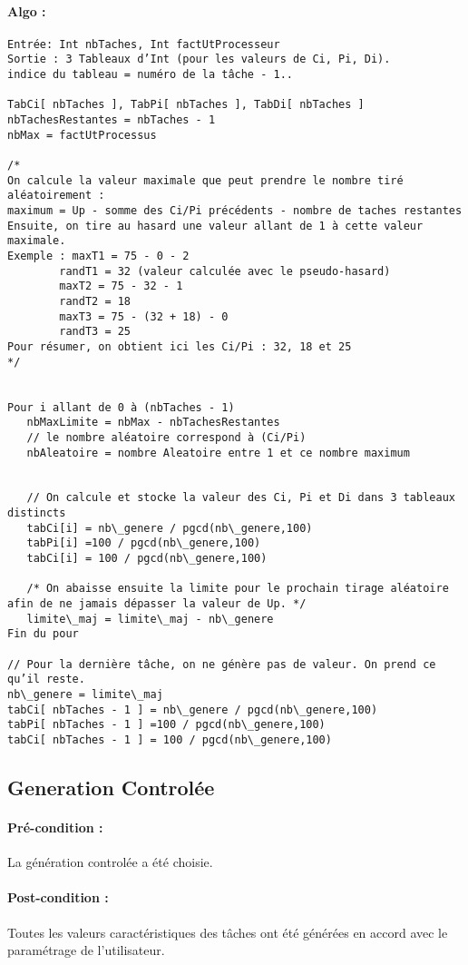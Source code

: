 		\paragraph{Algo :}
			\begin{verbatim}
Entrée: Int nbTaches, Int factUtProcesseur
Sortie : 3 Tableaux d’Int (pour les valeurs de Ci, Pi, Di). 
indice du tableau = numéro de la tâche - 1..

TabCi[ nbTaches ], TabPi[ nbTaches ], TabDi[ nbTaches ]
nbTachesRestantes = nbTaches - 1
nbMax = factUtProcessus 

/*
On calcule la valeur maximale que peut prendre le nombre tiré aléatoirement :
maximum = Up - somme des Ci/Pi précédents - nombre de taches restantes
Ensuite, on tire au hasard une valeur allant de 1 à cette valeur maximale.
Exemple : maxT1 = 75 - 0 - 2
	    randT1 = 32 (valeur calculée avec le pseudo-hasard)
	    maxT2 = 75 - 32 - 1
	    randT2 = 18
	    maxT3 = 75 - (32 + 18) - 0
	    randT3 = 25
Pour résumer, on obtient ici les Ci/Pi : 32, 18 et 25
*/


Pour i allant de 0 à (nbTaches - 1)
   nbMaxLimite = nbMax - nbTachesRestantes
   // le nombre aléatoire correspond à (Ci/Pi)
   nbAleatoire = nombre Aleatoire entre 1 et ce nombre maximum


   // On calcule et stocke la valeur des Ci, Pi et Di dans 3 tableaux distincts
   tabCi[i] = nb\_genere / pgcd(nb\_genere,100)
   tabPi[i] =100 / pgcd(nb\_genere,100)
   tabCi[i] = 100 / pgcd(nb\_genere,100)
	        
   /* On abaisse ensuite la limite pour le prochain tirage aléatoire afin de ne jamais dépasser la valeur de Up. */
   limite\_maj = limite\_maj - nb\_genere
Fin du pour

// Pour la dernière tâche, on ne génère pas de valeur. On prend ce qu’il reste.
nb\_genere = limite\_maj
tabCi[ nbTaches - 1 ] = nb\_genere / pgcd(nb\_genere,100)
tabPi[ nbTaches - 1 ] =100 / pgcd(nb\_genere,100)
tabCi[ nbTaches - 1 ] = 100 / pgcd(nb\_genere,100)
			\end{verbatim}

	\subsection{Generation Controlée}  
		\paragraph{Pré-condition :} La génération controlée a été choisie.
		\paragraph{Post-condition :} Toutes les valeurs caractéristiques des tâches ont été générées en accord avec le paramétrage de l’utilisateur.
